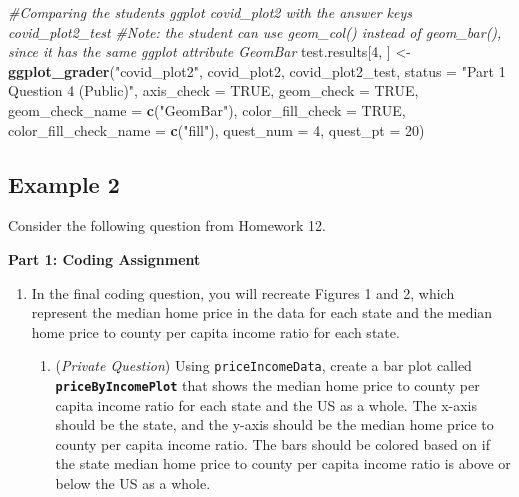 \documentclass[
  12pt,
]{book}
\newenvironment{Shaded}{\begin{snugshade}}{\end{snugshade}}
\newcommand{\AttributeTok}[1]{\textcolor[rgb]{0.13,0.29,0.53}{#1}}
\newcommand{\CommentTok}[1]{\textcolor[rgb]{0.56,0.35,0.01}{\textit{#1}}}
\newcommand{\ConstantTok}[1]{\textcolor[rgb]{0.56,0.35,0.01}{#1}}
\newcommand{\DecValTok}[1]{\textcolor[rgb]{0.00,0.00,0.81}{#1}}
\newcommand{\FunctionTok}[1]{\textcolor[rgb]{0.13,0.29,0.53}{\textbf{#1}}}
\newcommand{\NormalTok}[1]{#1}
\newcommand{\OtherTok}[1]{\textcolor[rgb]{0.56,0.35,0.01}{#1}}
\newcommand{\StringTok}[1]{\textcolor[rgb]{0.31,0.60,0.02}{#1}}
\providecommand{\tightlist}{%
  \setlength{\itemsep}{0pt}\setlength{\parskip}{0pt}}
\begin{document}
\begin{Shaded}
\begin{Highlighting}[]
\CommentTok{\#Comparing the student\textquotesingle{}s ggplot \textasciigrave{}covid\_plot2\textasciigrave{} with the answer key\textquotesingle{}s \textasciigrave{}covid\_plot2\_test\textasciigrave{} }
\CommentTok{\#Note: the student can use \textasciigrave{}geom\_col()\textasciigrave{} instead of \textasciigrave{}geom\_bar()\textasciigrave{}, since it has the same ggplot attribute \textasciigrave{}GeomBar\textasciigrave{}}
\NormalTok{test.results[}\DecValTok{4}\NormalTok{, ] }\OtherTok{\textless{}{-}} \FunctionTok{ggplot\_grader}\NormalTok{(}\StringTok{"covid\_plot2"}\NormalTok{, covid\_plot2, covid\_plot2\_test, }
                                   \AttributeTok{status =} \StringTok{"Part 1 Question 4 (Public)"}\NormalTok{, }\AttributeTok{axis\_check =} \ConstantTok{TRUE}\NormalTok{, }
                                   \AttributeTok{geom\_check =} \ConstantTok{TRUE}\NormalTok{, }\AttributeTok{geom\_check\_name =} \FunctionTok{c}\NormalTok{(}\StringTok{"GeomBar"}\NormalTok{), }
                                   \AttributeTok{color\_fill\_check =} \ConstantTok{TRUE}\NormalTok{, }\AttributeTok{color\_fill\_check\_name =} \FunctionTok{c}\NormalTok{(}\StringTok{"fill"}\NormalTok{),}
                                   \AttributeTok{quest\_num =} \DecValTok{4}\NormalTok{, }\AttributeTok{quest\_pt =} \DecValTok{20}\NormalTok{)}
\end{Highlighting}
\end{Shaded}

\subsection*{Example 2}\label{example-2}

Consider the following question from Homework 12.

\textbf{Part 1: Coding Assignment}

\begin{enumerate}
\def\labelenumi{\arabic{enumi}.}
\setcounter{enumi}{3}
\item
  In the final coding question, you will recreate Figures 1 and 2, which represent the median home price in the data for each state and the median home price to county per capita income ratio for each state.

  \begin{enumerate}
  \def\labelenumii{\alph{enumii})}
  \setcounter{enumii}{2}
  \tightlist
  \item
    (\emph{Private Question}) Using \texttt{priceIncomeData}, create a bar plot called \textbf{\texttt{priceByIncomePlot}} that shows the median home price to county per capita income ratio for each state and the US as a whole. The x-axis should be the state, and the y-axis should be the median home price to county per capita income ratio. The bars should be colored based on if the state median home price to county per capita income ratio is above or below the US as a whole.
  \end{enumerate}
\end{enumerate}
\end{document}
